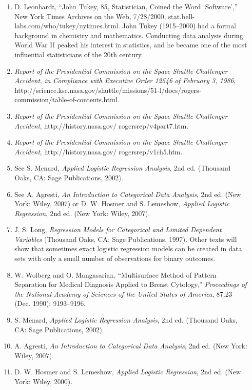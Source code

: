 \documentclass[
]{book}
\begin{document}
\begin{enumerate}

\item D. Leonhardt, “John Tukey, 85, Statistician, Coined the Word ‘Software’,” New York Times Archives on the Web, 7/28/2000, stat.bell-labs.com/who/tukey/nytimes.html. John Tukey (1915–2000) had a formal background in chemistry and mathematics. Conducting data analysis during World War II peaked his interest in statistics, and he became one of the most influential statisticians of the 20th century.
\item \textit{Report of the Presidential Commission on the Space Shuttle Challenger Accident, in Compliance with Executive Order 12546 of February 3, 1986}, http://science.ksc.nasa.gov/shuttle/missions/51-l/docs/rogers-commission/table-of-contents.html.
\item \textit{Report of the Presidential Commission on the Space Shuttle Challenger Accident}, http://history.nasa.gov/
rogersrep/v4part7.htm.
\item \textit{Report of the Presidential Commission on the Space Shuttle Challenger Accident}, http://history.nasa.gov/
rogersrep/v1ch5.htm.
\item See S. Menard, \textit{Applied Logistic Regression Analysis}, 2nd ed. (Thousand Oaks, CA: Sage Publications, 2002).
\item See A. Agresti, \textit{An Introduction to Categorical Data Analysis}, 2nd ed. (New York: Wiley, 2007) or D. W. Hosmer and S. Lemeshow, \textit{Applied Logistic Regression}, 2nd ed. (New York: Wiley, 2007).
\item J. S. Long, \textit{Regression Models for Categorical and Limited Dependent Variables} (Thousand Oaks, CA: Sage Publications, 1997). Other texts will show that sometimes exact logistic regression models can be created in data sets with only a small number of observations for binary outcomes.
\item W. Wolberg and O. Mangasarian, “Multisurface Method of Pattern Separation for Medical Diagnosis Applied to Breast Cytology,” \textit{Proceedings of the National Academy of Sciences of the United States of America}, 87.23 (Dec. 1990): 9193–9196.
\item S. Menard, \textit{Applied Logistic Regression Analysis}, 2nd ed. (Thousand Oaks, CA: Sage Publications, 2002).
\item A. Agresti, \textit{An Introduction to Categorical Data Analysis}, 2nd ed. (New York: Wiley, 2007).
\item D. W. Hosmer and S. Lemeshow, \textit{Applied Logistic Regression}, 2nd ed. (New York: Wiley, 2000).

\end{enumerate}
\end{document}
